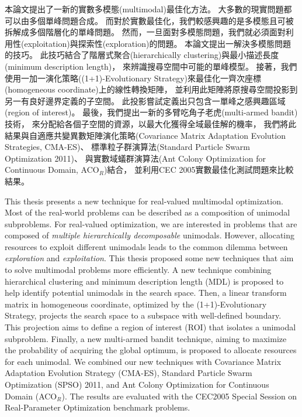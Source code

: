 \begin{abstractzh}
本論文提出了一新的實數多模態(multimodal)最佳化方法。
大多數的現實問題都可以由多個單峰問題合成。
而對於實數最佳化，我們較感興趣的是多模態且可被拆解成多個階層化的單峰問題。
然而，一旦面對多模態問題，我們就必須面對利用性(exploitation)與探索性(exploration)的問題。
本論文提出一解決多模態問題的技巧。
此技巧結合了階層式聚合(hierarchically clustering)與最小描述長度(minimum description length)， 來辨識搜尋空間中可能的單峰模型。
接著，我們使用一加一演化策略((1+1)-Evolutionary Strategy)來最佳化一齊次座標(homogeneous coordinate)上的線性轉換矩陣，
並利用此矩陣將原搜尋空間投影到另一有良好邊界定義的子空間。
此投影嘗試定義出只包含一單峰之感興趣區域(region of interest)。
最後，我們提出一新的多臂吃角子老虎(multi-armed bandit)技術，
來分配給各個子空間的資源，以最大化獲得全域最佳解的機率，
我們將此結果與自適應共變異數矩陣演化策略(Covariance Matrix Adaptation Evolution Strategies, CMA-ES)、
標準粒子群演算法(Standard Particle Swarm Optimization 2011)、
與實數域蟻群演算法(Ant Colony Optimization for Continuous Domain, ACO$_R$)結合，
並利用CEC 2005實數最佳化測試問題來比較結果。
\end{abstractzh}

\begin{abstracten}
This thesis presents a new technique for real-valued multimodal optimization.
Most of the real-world problems can be described as a composition of unimodal subproblems.
For real-valued optimization, we are interested in problems that are composed of \textit{multiple hierarchically decomposable} unimodals.
However, allocating resources to exploit different unimodals leads to the 
common dilemma between \textit{exploration} and \textit{exploitation}.
This thesis proposed some new techniques that aim to solve multimodal problems more efficiently.
A new technique combining hierarchical clustering and minimum description length (MDL) 
is proposed to help identify potential unimodals in the search space.
Then, a linear transform matrix in homogeneous coordinate, optimized by the (1+1)-Evolutionary Strategy,
projects the search space to a subspace with well-defined boundary.
This projection aims to define a region of interest (ROI) that isolates a unimodal subproblem.
Finally, a new multi-armed bandit technique, aiming to maximize the probability of acquiring the global optimum,
is proposed to allocate resources for each unimodal.
We combined our new techniques with Covariance Matrix Adaptation Evolution Strategy (CMA-ES), 
Standard Particle Swarm Optimization (SPSO) 2011, and Ant Colony Optimization for Continuous Domain (ACO$_R$).
The results are evaluated with the CEC2005 Special Session on Real-Parameter Optimization benchmark problems.
\end{abstracten}

